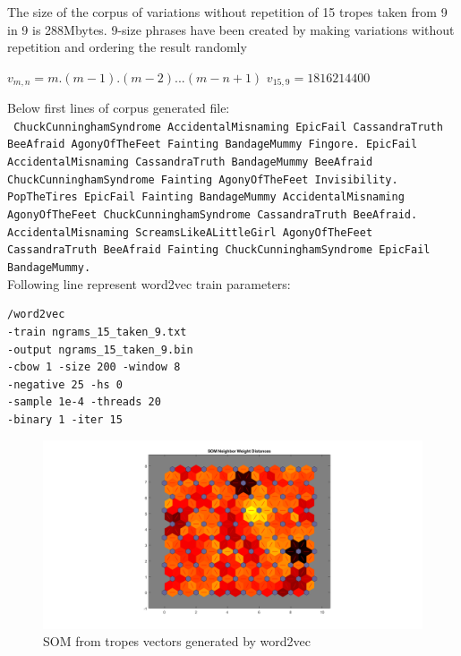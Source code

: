 \documentclass[letterpaper]{article}
\begin{document}
    The size of the corpus of variations without repetition of 15 tropes taken from 9 in 9 is 288Mbytes. 9-size phrases have been created by making variations without repetition and ordering the result randomly \\
	
	\begin{center}

${v}_{m,n} = m.(m-1).(m-2)...(m-n+1)$
${v}_{15,9} = 1816214400$
	
    \end{center}
	
	Below first lines of corpus generated file:\\
	\texttt{    
	ChuckCunninghamSyndrome AccidentalMisnaming EpicFail CassandraTruth BeeAfraid AgonyOfTheFeet Fainting BandageMummy Fingore. EpicFail AccidentalMisnaming CassandraTruth BandageMummy BeeAfraid ChuckCunninghamSyndrome Fainting AgonyOfTheFeet Invisibility. PopTheTires EpicFail Fainting BandageMummy AccidentalMisnaming AgonyOfTheFeet ChuckCunninghamSyndrome CassandraTruth BeeAfraid. AccidentalMisnaming ScreamsLikeALittleGirl AgonyOfTheFeet CassandraTruth BeeAfraid Fainting ChuckCunninghamSyndrome EpicFail BandageMummy.}\\

    Following line represent word2vec train parameters:\\
\begin{verbatim}
/word2vec 
-train ngrams_15_taken_9.txt 
-output ngrams_15_taken_9.bin 
-cbow 1 -size 200 -window 8 
-negative 25 -hs 0 
-sample 1e-4 -threads 20 
-binary 1 -iter 15
\end{verbatim}

	\begin{figure}
	\centering
		\includegraphics[width=1.25\linewidth]{../images/som_matlab_tropes_15_9}
			\caption{SOM from tropes vectors generated by word2vec}
			\label{fig:sommatlabtropes159}
		\end{figure}
	
\end{document}
